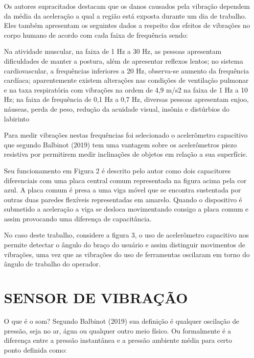 Os autores supracitados destacam que os danos causados pela vibração dependem da média da aceleração a qual a região está exposta durante um dia de trabalho. Eles também apresentam os seguintes dados a respeito dos efeitos de vibrações no corpo humano de acordo com cada faixa de frequência sendo:

\begin{citacao}
Na atividade muscular, na faixa de 1 Hz a 30 Hz, as pessoas apresentam dificuldades de manter a postura, além de apresentar reflexos lentos; no sistema cardiovascular, a frequências inferiores a 20 Hz, observa-se aumento da frequência cardíaca; 	aparentemente existem alterações nas condições de ventilação pulmonar e na taxa respiratória com vibrações na ordem de 4,9 m/s2 na faixa de 1 Hz a 10 Hz; 	na faixa de frequência de 0,1 Hz a 0,7 Hz, diversas pessoas apresentam enjoo, náuseas, perda de peso, redução da acuidade visual, insônia e distúrbios do labirinto 
\end{citacao}

Para medir vibrações nestas frequências foi selecionado o acelerômetro capacitivo que segundo Balbinot (2019) tem uma vantagem sobre os acelerômetros piezo resistiva por permitirem medir inclinações de objetos em relação a sua superfície.

Seu funcionamento em Figura 2 é descrito pelo autor como dois capacitores diferenciais com uma placa central comum representada na figura acima pela cor azul. A placa comum é presa a uma viga móvel que se encontra sustentada por outras duas paredes flexíveis representadas em amarelo. Quando o dispositivo é submetido a aceleração a viga se desloca movimentando consigo a placa comum e assim provocando uma diferença de capacitância.

No caso deste trabalho, considere a figura 3, o uso de acelerômetro capacitivo nos permite detectar o ângulo do braço do usuário e assim distinguir movimentos de vibrações, uma vez que as vibrações do uso de ferramentas oscilaram em torno do ângulo de trabalho do operador.

\section{SENSOR DE VIBRAÇÃO}
\label{subsec: sensorDeVibracao}

O que é o som? Segundo Balbinot (2019) sua definição é qualquer oscilação de pressão, seja no ar, água ou qualquer outro meio físico. Ou formalmente é a diferença entre a pressão instantânea e a pressão ambiente média para certo ponto definida como:

